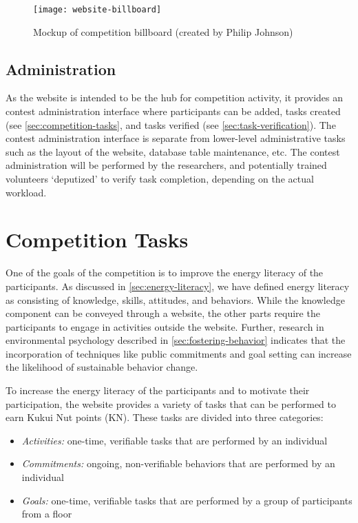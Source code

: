 \begin{figure}[htb]
	\centering
		\texttt{[image: website-billboard]}
		\caption{Mockup of competition billboard (created by Philip Johnson)}
		\label{fig:website-billboard}
\end{figure}

\subsection{Administration}

As the website is intended to be the hub for competition activity, it provides an contest administration interface where participants can be added, tasks created (see \autoref{sec:competition-tasks}, and tasks verified (see \autoref{sec:task-verification}). The contest administration interface is separate from lower-level administrative tasks such as the layout of the website, database table maintenance, etc. The contest administration will be performed by the researchers, and potentially trained volunteers `deputized' to verify task completion, depending on the actual workload.


\section{Competition Tasks}
\label{sec:competition-tasks}

One of the goals of the competition is to improve the energy literacy of the participants. As discussed in \autoref{sec:energy-literacy}, we have defined energy literacy as consisting of knowledge, skills, attitudes, and behaviors. While the knowledge component can be conveyed through a website, the other parts require the participants to engage in activities outside the website. Further, research in environmental psychology described in \autoref{sec:fostering-behavior} indicates that the incorporation of techniques like public commitments and goal setting can increase the likelihood of sustainable behavior change.

To increase the energy literacy of the participants and to motivate their participation, the website provides a variety of tasks that can be performed to earn Kukui Nut points (KN). These tasks are divided into three categories:

\begin{itemize}
	\item \emph{Activities:} one-time, verifiable tasks that are performed by an individual
	\item \emph{Commitments:} ongoing, non-verifiable behaviors that are performed by an individual
	\item \emph{Goals:} one-time, verifiable tasks that are performed by a group of participants from a floor
\end{itemize}

